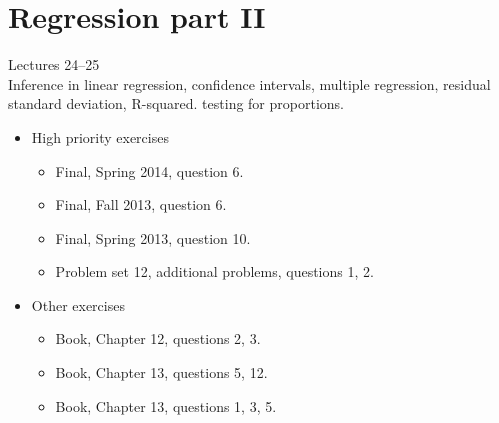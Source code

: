 \documentclass[11pt]{article}
\begin{document}
\section{Regression part II}
Lectures 24--25 \\[0.2in]
Inference in linear regression, confidence intervals, multiple regression, residual standard deviation, R-squared.
testing for proportions.
\begin{itemize}
	\item High priority exercises
		\begin{itemize}
			\item Final, Spring 2014, question 6.
			\item Final, Fall 2013, question 6.
			\item Final, Spring 2013, question 10.
			\item Problem set 12, additional problems, questions 1, 2.
		\end{itemize}
	\item Other exercises
	\begin{itemize}
		\item Book, Chapter 12, questions 2, 3.
		\item Book, Chapter 13, questions 5, 12.
		\item Book, Chapter 13, questions 1, 3, 5. 
	\end{itemize}
\end{itemize}



\end{document}
